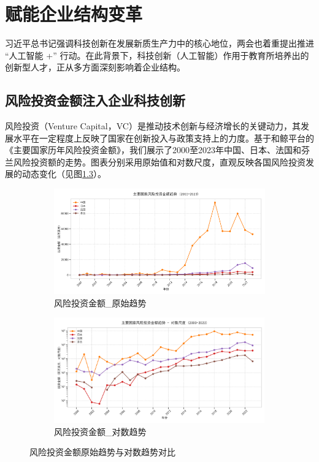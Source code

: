 \chapter{赋能企业结构变革}
\label{chapter:Enterprise}
习近平总书记强调科技创新在发展新质生产力中的核心地位，两会也着重提出推进 “人工智能 +” 行动。在此背景下，科技创新（人工智能）作用于教育所培养出的创新型人才，正从多方面深刻影响着企业结构。

\section{风险投资金额注入企业科技创新}
风险投资（Venture Capital，VC）是推动技术创新与经济增长的关键动力，其发展水平在一定程度上反映了国家在创新投入与政策支持上的力度。基于和鲸平台的《主要国家历年风险投资金额》，我们展示了2000至2023年中国、日本、法国和芬兰风险投资额的走势。图表分别采用原始值和对数尺度，直观反映各国风险投资发展的动态变化（见图\ref{fig:主要国家风险投资金额趋势}）。

\begin{figure}[H]
    \centering
    \begin{subfigure}[b]{0.45\linewidth} %
        \centering
        \includegraphics[width=\linewidth]{figure/07主要国家风险投资金额趋势.png}
        \caption{风险投资金额\_原始趋势}
        \label{fig:风险投资金额_原始趋势}
    \end{subfigure}
    \hfill %
    \begin{subfigure}[b]{0.45\linewidth}
        \centering
        \includegraphics[width=\linewidth]{figure/06主要国家风险投资金额趋势-对数尺度.png}
        \caption{风险投资金额\_对数趋势}
        \label{fig:风险投资金额_对数趋势}
    \end{subfigure}
    \caption{风险投资金额原始趋势与对数趋势对比}
    \label{fig:主要国家风险投资金额趋势}
\end{figure}

